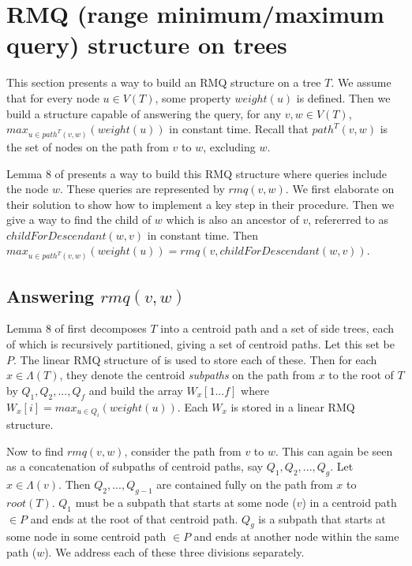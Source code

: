 \documentclass{article}
\newcommand{\leafset}{\Lambda}
\begin{document}
    \section{RMQ (range minimum/maximum query) structure on trees}
    \label{sec:rmqstructure}

    This section presents a way to build an RMQ structure on a tree $T$. We assume that for every node $u \in V(T)$, some property $weight(u)$ is defined. Then we build a structure capable of answering the query, for any $v, w \in V(T)$, $max_{u \in path^{T}(v, w)}(weight(u))$ in constant time. Recall that $path^{T}(v, w)$ is the set of nodes on the path from $v$ to $w$, excluding $w$.

    Lemma 8 of \cite{jansson2018algorithms} presents a way to build this RMQ structure where queries include the node $w$. These queries are represented by $rmq(v, w)$. We first elaborate on their solution to show how to implement a key step in their procedure. Then we give a way to find the child of $w$ which is also an ancestor of $v$, refererred to as $childForDescendant(w, v)$ in constant time. Then $max_{u \in path^{T}(v, w)}(weight(u)) = rmq(v, childForDescendant(w, v))$.

    \subsection{Answering $rmq(v, w)$}
    \label{subsec:answeringrmq}

    Lemma 8 of \cite{jansson2018algorithms} first decomposes $T$ into a centroid path and a set of side trees, each of which is recursively partitioned, giving a set of centroid paths. Let this set be $P$. The linear RMQ structure of \cite{bender2000lca} is used to store each of these. Then for each $x \in \leafset(T)$, they denote the centroid \textit{subpaths} on the path from $x$ to the root of $T$ by $Q_1, Q_2, ..., Q_f$ and build the array $W_x[1 ... f]$ where $W_x[i] = max_{u \in Q_i}(weight(u))$. Each $W_x$ is stored in a linear RMQ structure.

    Now to find $rmq(v, w)$, consider the path from $v$ to $w$. This can again be seen as a concatenation of subpaths of centroid paths, say $Q_1, Q_2, ..., Q_g$. Let $x \in \leafset(v)$. Then $Q_2, ..., Q_{g - 1}$ are contained fully on the path from $x$ to $root(T)$. $Q_1$ must be a subpath that starts at some node ($v$) in a centroid path $\in P$ and ends at the root of that centroid path. $Q_g$ is a subpath that starts at some node in some centroid path $\in P$ and ends at another node within the same path ($w$). We address each of these three divisions separately.
\end{document}
